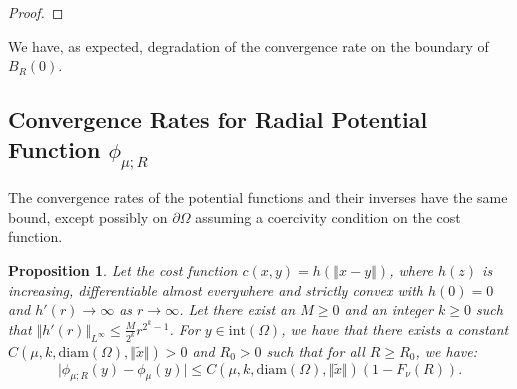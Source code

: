 \documentclass{amsart}
\theoremstyle{lemma}
\newtheorem{proposition}[theorem]{Proposition}
\theoremstyle{remark}
\begin{document}
\begin{proof}
\end{proof}

We have, as expected, degradation of the convergence rate on the boundary of $B_{R}(0)$.

\subsection{Convergence Rates for Radial Potential Function $\phi_{\mu; R}$}\label{sec:inverseradialBrenier}

The convergence rates of the potential functions and their inverses have the same bound, except possibly on $\partial \Omega$ assuming a coercivity condition on the cost function.

\begin{proposition}
Let the cost function $c(x,y) = h(\left\Vert x - y \right\Vert)$, where $h(z)$ is increasing, differentiable almost everywhere and strictly convex with $h(0) = 0$ and $h'(r) \rightarrow \infty$ as $r \rightarrow \infty$. Let there exist an $M \geq 0$ and an integer $k \geq 0$ such that $\Vert h'(r) \Vert_{L^{\infty}} \leq \frac{M}{2^{k}} r^{2^{k}-1}$. For $y \in \text{int}(\Omega)$, we have that there exists a constant $C(\mu, k, \text{diam}(\Omega), \Vert \tilde{x} \Vert)>0$ and $R_0>0$ such that for all $R \geq R_0$, we have:
\begin{equation}
\vert \phi_{\mu; R}(y) - \phi_{\mu}(y) \vert \leq C(\mu, k, \text{diam}(\Omega), \Vert \tilde{x} \Vert) (1-F_{\nu}(R)).
\end{equation}
\end{proposition}
\end{document}
